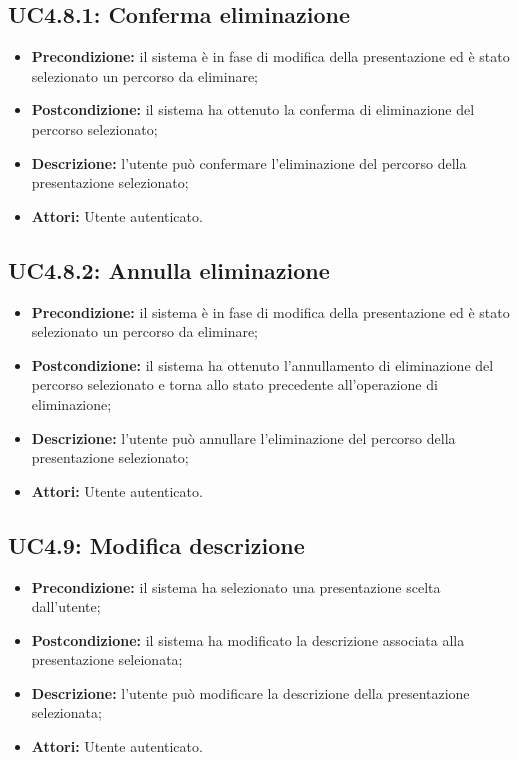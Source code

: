 \subsection{ UC4.8.1: Conferma eliminazione}

\begin{itemize}
	\item \textbf{Precondizione:} il sistema è in fase di modifica della presentazione ed è stato selezionato un percorso da eliminare;
	\item \textbf{Postcondizione:} il sistema ha ottenuto la conferma di eliminazione del percorso selezionato;
	\item \textbf{Descrizione:} l'utente può confermare l'eliminazione del percorso della presentazione selezionato;
	\item \textbf{Attori:} Utente autenticato.
\end{itemize}
\subsection{ UC4.8.2: Annulla eliminazione}

\begin{itemize}
	\item \textbf{Precondizione:} il sistema è in fase di modifica della presentazione ed è stato selezionato un percorso da eliminare;
	\item \textbf{Postcondizione:} il sistema ha ottenuto l'annullamento di eliminazione del percorso selezionato e torna allo stato precedente all'operazione di eliminazione;
	\item \textbf{Descrizione:} l'utente può annullare l'eliminazione del percorso della presentazione selezionato;
	\item \textbf{Attori:} Utente autenticato.
\end{itemize}
\subsection{ UC4.9: Modifica descrizione}

\begin{itemize}
	\item \textbf{Precondizione:} il sistema ha selezionato una presentazione scelta dall'utente;
	\item \textbf{Postcondizione:} il sistema ha modificato la descrizione associata alla presentazione seleionata;
	\item \textbf{Descrizione:} l'utente può modificare la descrizione della presentazione selezionata;
	\item \textbf{Attori:} Utente autenticato.
\end{itemize}
